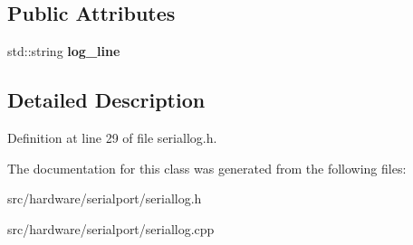 \subsection*{Public Attributes}
\begin{DoxyCompactItemize}
\item 
\hypertarget{classCSerialLog_a361e7f8181ab61f121ce0375299c3d1e}{std\-::string {\bfseries log\-\_\-line}}\label{classCSerialLog_a361e7f8181ab61f121ce0375299c3d1e}

\end{DoxyCompactItemize}


\subsection{Detailed Description}


Definition at line 29 of file seriallog.\-h.



The documentation for this class was generated from the following files\-:\begin{DoxyCompactItemize}
\item 
src/hardware/serialport/seriallog.\-h\item 
src/hardware/serialport/seriallog.\-cpp\end{DoxyCompactItemize}
